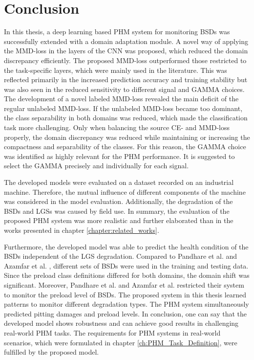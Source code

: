 \chapter{Conclusion}\label{chapter:conclusion}

In this thesis, a deep learning based PHM system for monitoring BSDs was successfully extended with a domain adaptation module. A novel way of applying the MMD-loss in the layers of the CNN was proposed, which reduced the domain discrepancy efficiently. The proposed MMD-loss outperformed those restricted to the task-specific layers, which were mainly used in the literature. This was reflected primarily in the increased prediction accuracy and training stability but was also seen in the reduced sensitivity to different signal and GAMMA choices. The development of a novel labeled MMD-loss revealed the main deficit of the regular unlabeled MMD-loss. If the unlabeled MMD-loss became too dominant, the class separability in both domains was reduced, which made the classification task more challenging. Only when balancing the source CE- and MMD-loss properly, the domain discrepancy was reduced while maintaining or increasing the compactness and separability of the classes. For this reason, the GAMMA choice was identified as highly relevant for the PHM performance. It is suggested to select the GAMMA precisely and individually for each signal.

The developed models were evaluated on a dataset recorded on an industrial machine. Therefore, the mutual influence of different components of the machine was considered in the model evaluation. Additionally, the degradation of the BSDs and LGSs was caused by field use. In summary, the evaluation of the proposed PHM system was more realistic and further elaborated than in the works presented in chapter \ref{chapter:related_works}.

Furthermore, the developed model was able to predict the health condition of the BSDs independent of the LGS degradation. Compared to Pandhare et al. \cite{Pandhare2021} and Azamfar et al. \cite{AZAMFAR2020103932}, different sets of BSDs were used in the training and testing data. Since the preload class definitions differed for both domains, the domain shift was significant.
Moreover, Pandhare et al. \cite{Pandhare2021} and Azamfar et al. \cite{AZAMFAR2020103932} restricted their system to monitor the preload level of BSDs. The proposed system in this thesis learned patterns to monitor different degradation types. The PHM system simultaneously predicted pitting damages and preload levels. In conclusion, one can say that the developed model shows robustness and can achieve good results in challenging real-world PHM tasks. The requirements for PHM systems in real-world scenarios, which were formulated in chapter \ref{ch:PHM_Task_Definition}, were fulfilled by the proposed model.
